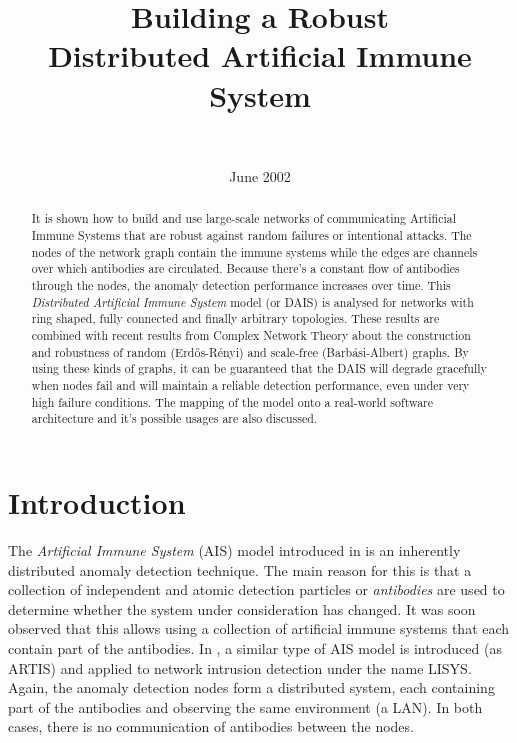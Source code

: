 \documentclass{article}
\title{ Building a Robust \\
        Distributed Artificial Immune System }
\author{\\}
\date{June 2002}
\begin{document}
\maketitle

\begin{abstract}
It is shown how to build and use large-scale networks of communicating Artificial Immune Systems that are robust against random failures or intentional attacks.
The nodes of the network graph contain the immune systems while the edges are channels over which antibodies are circulated.
Because there's a constant flow of antibodies through the nodes, the anomaly detection performance increases over time.
This {\it Distributed Artificial Immune System} model (or DAIS) is analysed for networks with ring shaped, fully connected and finally arbitrary topologies.
These results are combined with recent results from Complex Network Theory about the construction and robustness of random (Erd\H os-R\'{e}nyi) and scale-free (Barb\'{a}si-Albert) graphs.
By using these kinds of graphs, it can be guaranteed that the DAIS will degrade gracefully when nodes fail and will maintain a reliable detection performance, even under very high failure conditions.
The mapping of the model onto a real-world software architecture and it's possible usages are also discussed.
\end{abstract}


\section{Introduction}
\label{sec_introduction}
The {\it Artificial Immune System} (AIS) model introduced in \cite{forrest_first} is an inherently distributed anomaly detection technique.
The main reason for this is that a collection of independent and atomic detection particles or {\it antibodies} are used to determine whether the system under consideration has changed.
It was soon observed \cite{forrest_first} that this allows using a collection of artificial immune systems that each contain part of the antibodies.
In \cite{hofmeyr_architecture}, a similar type of AIS model is introduced (as ARTIS) and applied to network intrusion detection under the name LISYS.
Again, the anomaly detection nodes form a distributed system, each containing part of the antibodies and observing the same environment (a LAN).
In both cases, there is no communication of antibodies between the nodes.
\end{document}
